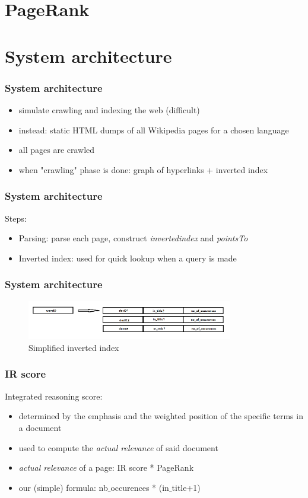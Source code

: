 \documentclass[10pt]{beamer}
\begin{document}
\section{PageRank}


\section{System architecture}


\begin{frame}
\frametitle{System architecture}

\begin{itemize}
\item simulate crawling and indexing the web (difficult)
\item instead: static HTML dumps of all Wikipedia pages for a chosen language
\item all pages are crawled
\item when "crawling" phase is done: graph of hyperlinks + inverted index
\end{itemize}
\end{frame}

\begin{frame}
\frametitle{System architecture}

Steps:

\begin{itemize}
\item Parsing: parse each page, construct \emph{invertedindex} and \emph{pointsTo}
\item Inverted index: used for quick lookup when a query is made
\end{itemize}
\end{frame}

\begin{frame}
\frametitle{System architecture}
\begin{figure}[h]
\includegraphics[width=0.8\textwidth]{index.png}
\caption{Simplified inverted index}
\end{figure}
\end{frame}


\begin{frame}
\frametitle{IR score}
Integrated reasoning score:

\begin{itemize}
\item determined by the emphasis and the weighted position of the specific terms in a document
\item used to compute the \emph{actual relevance}  of said document
\item \emph{actual relevance} of a page: IR score * PageRank
\item our (simple) formula: nb$\_$occurences * (in$\_$title+1)
\end{itemize}
\end{frame}
\end{document}
